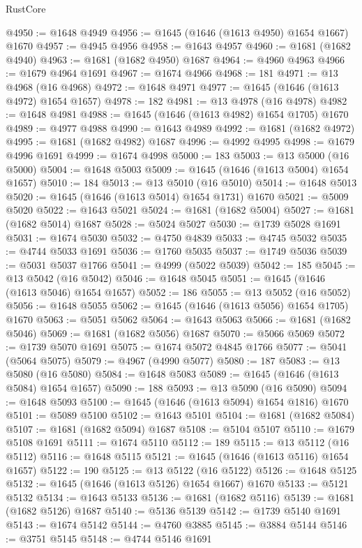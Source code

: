 \begin{lexlean}{RustCore}
\begin{coremodule}
@4950 := @1648 @4949
@4956 := @1645 (@1646 (@1613 @4950) @1654 @1667) @1670
@4957 := @4945 @4956
@4958 := @1643 @4957
@4960 := @1681 (@1682 @4940)
@4963 := @1681 (@1682 @4950) @1687
@4964 := @4960 @4963
@4966 := @1679 @4964 @1691
@4967 := @1674 @4966
@4968 := 181
@4971 := @13 @4968 (@16 @4968)
@4972 := @1648 @4971
@4977 := @1645 (@1646 (@1613 @4972) @1654 @1657)
@4978 := 182
@4981 := @13 @4978 (@16 @4978)
@4982 := @1648 @4981
@4988 := @1645 (@1646 (@1613 @4982) @1654 @1705) @1670
@4989 := @4977 @4988
@4990 := @1643 @4989
@4992 := @1681 (@1682 @4972)
@4995 := @1681 (@1682 @4982) @1687
@4996 := @4992 @4995
@4998 := @1679 @4996 @1691
@4999 := @1674 @4998
@5000 := 183
@5003 := @13 @5000 (@16 @5000)
@5004 := @1648 @5003
@5009 := @1645 (@1646 (@1613 @5004) @1654 @1657)
@5010 := 184
@5013 := @13 @5010 (@16 @5010)
@5014 := @1648 @5013
@5020 := @1645 (@1646 (@1613 @5014) @1654 @1731) @1670
@5021 := @5009 @5020
@5022 := @1643 @5021
@5024 := @1681 (@1682 @5004)
@5027 := @1681 (@1682 @5014) @1687
@5028 := @5024 @5027
@5030 := @1739 @5028 @1691
@5031 := @1674 @5030
@5032 := @4750 @4839
@5033 := @4745 @5032
@5035 := @4744 @5033 @1691
@5036 := @1760 @5035
@5037 := @1749 @5036
@5039 := @5031 @5037 @1766
@5041 := @4999 (@5022 @5039)
@5042 := 185
@5045 := @13 @5042 (@16 @5042)
@5046 := @1648 @5045
@5051 := @1645 (@1646 (@1613 @5046) @1654 @1657)
@5052 := 186
@5055 := @13 @5052 (@16 @5052)
@5056 := @1648 @5055
@5062 := @1645 (@1646 (@1613 @5056) @1654 @1705) @1670
@5063 := @5051 @5062
@5064 := @1643 @5063
@5066 := @1681 (@1682 @5046)
@5069 := @1681 (@1682 @5056) @1687
@5070 := @5066 @5069
@5072 := @1739 @5070 @1691
@5075 := @1674 @5072 @4845 @1766
@5077 := @5041 (@5064 @5075)
@5079 := @4967 (@4990 @5077)
@5080 := 187
@5083 := @13 @5080 (@16 @5080)
@5084 := @1648 @5083
@5089 := @1645 (@1646 (@1613 @5084) @1654 @1657)
@5090 := 188
@5093 := @13 @5090 (@16 @5090)
@5094 := @1648 @5093
@5100 := @1645 (@1646 (@1613 @5094) @1654 @1816) @1670
@5101 := @5089 @5100
@5102 := @1643 @5101
@5104 := @1681 (@1682 @5084)
@5107 := @1681 (@1682 @5094) @1687
@5108 := @5104 @5107
@5110 := @1679 @5108 @1691
@5111 := @1674 @5110
@5112 := 189
@5115 := @13 @5112 (@16 @5112)
@5116 := @1648 @5115
@5121 := @1645 (@1646 (@1613 @5116) @1654 @1657)
@5122 := 190
@5125 := @13 @5122 (@16 @5122)
@5126 := @1648 @5125
@5132 := @1645 (@1646 (@1613 @5126) @1654 @1667) @1670
@5133 := @5121 @5132
@5134 := @1643 @5133
@5136 := @1681 (@1682 @5116)
@5139 := @1681 (@1682 @5126) @1687
@5140 := @5136 @5139
@5142 := @1739 @5140 @1691
@5143 := @1674 @5142
@5144 := @4760 @3885
@5145 := @3884 @5144
@5146 := @3751 @5145
@5148 := @4744 @5146 @1691

\end{coremodule}
\end{lexlean}
